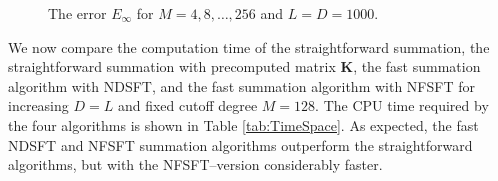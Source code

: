 \documentclass[11pt,a4paper,twoside,bibtotoc]{scrartcl}
\theoremstyle{plain}
\theoremstyle{definition}
\theoremstyle{remark}
\newcommand{\mb}[1]{\mathbf{#1}}
\newcommand{\V}[1]{\mb{#1}}
\numberwithin{equation}{section}
\numberwithin{table}{section}
\numberwithin{figure}{section}
\begin{document}
\begin{figure}[tb]
  \centering
  \hfill
  \caption{The error $E_{\infty}$ for $M = 4,8,\ldots,256$ and $L = D = 1000$.}
  \label{Figure:PoissonTest}
\end{figure}

We now compare the computation time of the straightforward summation, the
straightforward summation with precomputed matrix $\V{K}$, the fast summation
algorithm with NDSFT, and the fast summation algorithm with NFSFT for
increasing $D=L$ and fixed cutoff degree $M=128$. 
The CPU time required by the four algorithms is shown in Table
\ref{tab:TimeSpace}. 
As expected, the fast NDSFT and NFSFT summation algorithms outperform the 
straightforward algorithms, but with the NFSFT--version considerably faster.
\end{document}
